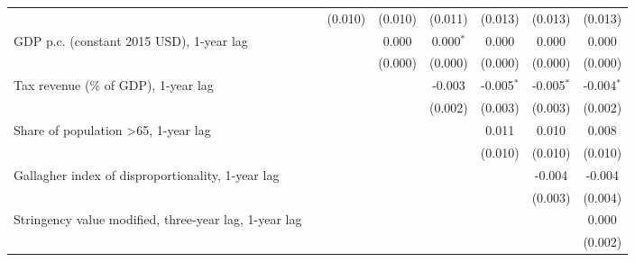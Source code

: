 \begin{table}[htbp]
\begin{tabular}{lccccccc}
                                                                                              &                & (0.010)       & (0.010)       & (0.011)       & (0.013)      & (0.013)      & (0.013)\\   
      GDP p.c. (constant 2015 USD), 1-year lag                                                &                &               & 0.000         & 0.000$^{*}$   & 0.000        & 0.000        & 0.000\\   
                                                                                              &                &               & (0.000)       & (0.000)       & (0.000)      & (0.000)      & (0.000)\\   
      Tax revenue (\% of GDP), 1-year lag                                                     &                &               &               & -0.003        & -0.005$^{*}$ & -0.005$^{*}$ & -0.004$^{*}$\\   
                                                                                              &                &               &               & (0.002)       & (0.003)      & (0.003)      & (0.002)\\   
      Share of population >65, 1-year lag                                                     &                &               &               &               & 0.011        & 0.010        & 0.008\\   
                                                                                              &                &               &               &               & (0.010)      & (0.010)      & (0.010)\\   
      Gallagher index of disproportionality, 1-year lag                                       &                &               &               &               &              & -0.004       & -0.004\\   
                                                                                              &                &               &               &               &              & (0.003)      & (0.004)\\   
      Stringency value modified, three-year lag, 1-year lag                                   &                &               &               &               &              &              & 0.000\\   
                                                                                              &                &               &               &               &              &              & (0.002)\\   

\end{tabular}
\end{table}
